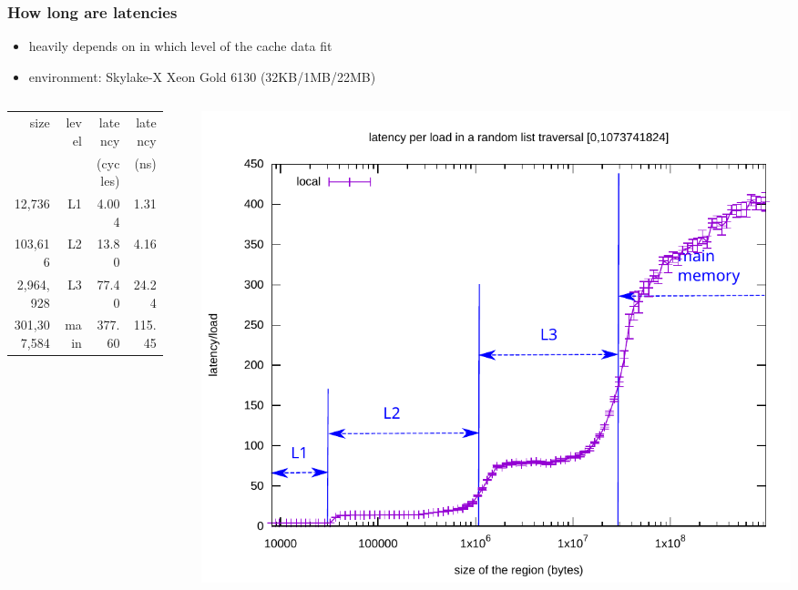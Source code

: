 \documentclass[12pt,dvipdfmx]{beamer}
\begin{document}
\begin{frame}
\frametitle{How long are latencies}
\begin{itemize}
\item heavily depends on in which level of the cache data fit
\item environment: Skylake-X Xeon Gold 6130 (32KB/1MB/22MB)
\end{itemize}

\begin{columns}
  \begin{column}{0.4\textwidth}
{\scriptsize
\begin{tabular}{|r|r|r|r|}\hline
size         & level & latency  & latency \\
             &       & (cycles) & (ns)    \\\hline
  12,736     & L1    & 4.004    & 1.31     \\
 103,616     & L2    & 13.80    & 4.16     \\
 2,964,928   & L3    & 77.40    & 24.24    \\
 301,307,584 & main  & 377.60   & 115.45   \\\hline
\end{tabular}
}
\end{column}
\begin{column}{0.05\textwidth}
\end{column}
\begin{column}{0.55\textwidth}
\begin{center}
\includegraphics[width=\textwidth]{out/pdf/svg/latency_cliff.pdf}
\end{center}
\end{column}
\end{columns}
\end{frame}
\end{document}

